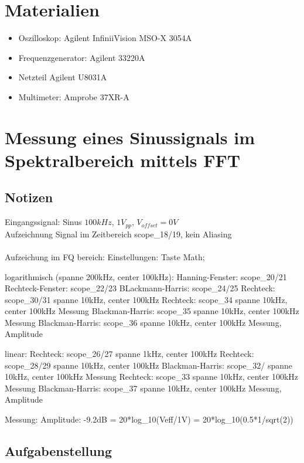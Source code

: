 \documentclass[12pt,a4paper,titlepage]{article}
\begin{document}
\setcounter{page}{2}

\newpage
\setcounter{tocdepth}{1}
\tableofcontents

\newpage

\section*{Materialien}
\begin{itemize}
	\item Oszilloskop: Agilent InfiniiVision MSO-X 3054A
	\item Frequenzgenerator: Agilent 33220A
  \item Netzteil Agilent U8031A
  \item Multimeter: Amprobe 37XR-A
\end{itemize}

\section{Messung eines Sinussignals im Spektralbereich mittels FFT}

\subsection*{Notizen}
Eingangssignal: Sinus $100kHz$, $1V_{pp}$, $V_{offset}=0V$ \\
Aufzeichnung Signal im Zeitbereich scope\_18/19, kein Aliasing \\
\\
Aufzeichung im FQ bereich: Einstellungen: Taste Math;

logarithmisch (spanne 200kHz, center 100kHz):
Hanning-Fenster: scope_20/21
Rechteck-Fenster: scope_22/23
BLackmann-Harris: scope_24/25
Rechteck: scope_30/31 spanne 10kHz, center 100kHz
Rechteck: scope_34 spanne 10kHz, center 100kHz Messung
Blackman-Harris: scope_35 spanne 10kHz, center 100kHz Messung
Blackman-Harris: scope_36 spanne 10kHz, center 100kHz Messung, Amplitude

linear:
Rechteck: scope_26/27 spanne 1kHz, center 100kHz
Rechteck: scope_28/29 spanne 10kHz, center 100kHz
Blackman-Harris: scope_32/ spanne 10kHz, center 100kHz Messung
Rechteck: scope_33 spanne 10kHz, center 100kHz Messung
Blackman-Harris: scope_37 spanne 10kHz, center 100kHz Messung, Amplitude

Messung: Amplitude: -9.2dB = 20*log_10(Veff/1V) = 20*log_10(0.5*1/sqrt(2))


\subsection*{Aufgabenstellung}
\end{document}
